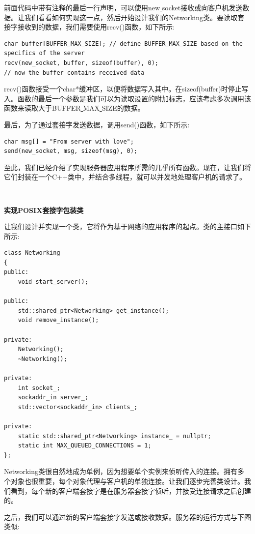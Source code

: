 前面代码中带有注释的最后一行声明，可以使用new\underline{ }socket接收或向客户机发送数据。让我们看看如何实现这一点，然后开始设计我们的Networking类。要读取套接字接收到的数据，我们需要使用recv()函数，如下所示: \par

\begin{lstlisting}[caption={}]
char buffer[BUFFER_MAX_SIZE]; // define BUFFER_MAX_SIZE based on the
specifics of the server
recv(new_socket, buffer, sizeof(buffer), 0);
// now the buffer contains received data
\end{lstlisting}

recv()函数接受一个char*缓冲区，以便将数据写入其中。在sizeof(buffer)时停止写入。函数的最后一个参数是我们可以为读取设置的附加标志，应该考虑多次调用该函数来读取大于BUFFER\underline{ }MAX\underline{ }SIZE的数据。 \par
最后，为了通过套接字发送数据，调用send()函数，如下所示: \par

\begin{lstlisting}[caption={}]
char msg[] = "From server with love";
send(new_socket, msg, sizeof(msg), 0);
\end{lstlisting}

至此，我们已经介绍了实现服务器应用程序所需的几乎所有函数。现在，让我们将它们封装在一个C++类中，并结合多线程，就可以并发地处理客户机的请求了。 \par

\noindent\textbf{}\ \par
\textbf{实现POSIX套接字包装类} \ \par
让我们设计并实现一个类，它将作为基于网络的应用程序的起点。类的主接口如下所示: \par

\begin{lstlisting}[caption={}]
class Networking
{
public:
	void start_server();
	
public:
	std::shared_ptr<Networking> get_instance();
	void remove_instance();
	
private:
	Networking();
	~Networking();
	
private:
	int socket_;
	sockaddr_in server_;
	std::vector<sockaddr_in> clients_;
	
private:
	static std::shared_ptr<Networking> instance_ = nullptr;
	static int MAX_QUEUED_CONNECTIONS = 1;
};
\end{lstlisting}

Networking类很自然地成为单例，因为想要单个实例来侦听传入的连接。拥有多个对象也很重要，每个对象代理与客户机的单独连接。让我们逐步完善类设计。我们看到，每个新的客户端套接字是在服务器套接字侦听，并接受连接请求之后创建的。 \par
之后，我们可以通过新的客户端套接字发送或接收数据。服务器的运行方式与下图类似: \par

